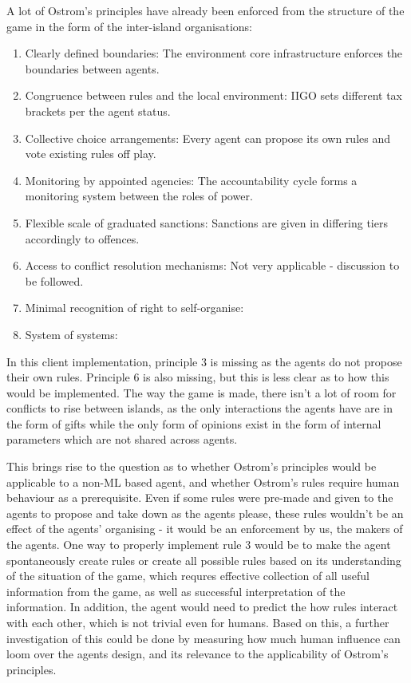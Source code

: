 A lot of Ostrom’s principles have already been enforced from the structure of the game in the form of the inter-island organisations:
\begin{enumerate}
    \item Clearly defined boundaries: The environment core infrastructure enforces the boundaries between agents.
    \item Congruence between rules and the local environment: IIGO sets different tax brackets per the agent status.
    \item Collective choice arrangements: Every agent can propose its own rules and vote existing rules off play.
    \item Monitoring by appointed agencies: The accountability cycle forms a monitoring system between the roles of power.
    \item Flexible scale of graduated sanctions: Sanctions are given in differing tiers accordingly to offences.
    \item Access to conflict resolution mechanisms: Not very applicable - discussion to be followed.
    \item Minimal recognition of right to self-organise: 
    \item System of systems: 
\end{enumerate}
In this client implementation, principle 3 is missing as the agents do not propose their own rules. Principle 6 is also missing, but this is less clear as to how this would be implemented. The way the game is made, there isn't a lot of room for conflicts to rise between islands, as the only interactions the agents have are in the form of gifts while the only form of opinions exist in the form of internal parameters which are not shared across agents.

This brings rise to the question as to whether Ostrom’s principles would be applicable to a non-ML based agent, and whether Ostrom’s rules require human behaviour as a prerequisite. Even if some rules were pre-made and given to the agents to propose and take down as the agents please, these rules wouldn't be an effect of the agents' organising - it would be an enforcement by us, the makers of the agents. One way to properly implement rule 3 would be to make the agent spontaneously create rules or create all possible rules based on its understanding of the situation of the game, which requres effective collection of all useful information from the game, as well as successful interpretation of the information. In addition, the agent would need to predict the how rules interact with each other, which is not trivial even for humans. Based on this, a further investigation of this could be done by measuring how much human influence can loom over the agents design, and its relevance to the applicability of Ostrom’s principles.


